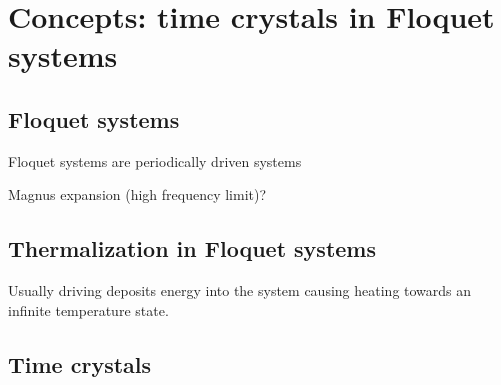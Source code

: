 \chapter{Concepts: time crystals in Floquet systems}\label{ch:introduction-floquet}



\section{Floquet systems}

Floquet systems are periodically driven systems

Magnus expansion (high frequency limit)?

\section{Thermalization in Floquet systems}

Usually driving deposits energy into the system causing heating towards an infinite temperature state.

\section{Time crystals}
